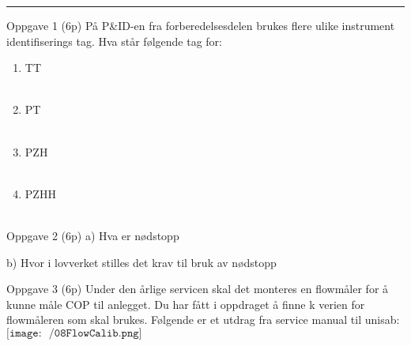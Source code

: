 \hrule
\vfil \eject
Oppgave 1 (6p)%
\vskip 2.5pt 
På P\&ID-en fra forberedelsesdelen brukes flere ulike instrument identifiserings tag. Hva står følgende tag for:\begin{enumerate}
	\item TT \\\\
	\item PT\\\\
	\item PZH\\\\
	\item PZHH\\\\
\end{enumerate}


\vskip 2.5pt 


Oppgave 2 (6p) %
\vskip 2.5pt 
a) Hva er nødstopp \\
\vskip 2.5pt 
\vskip 2.5pt 
b) Hvor i lovverket stilles det krav til bruk av nødstopp \\
\vskip 2.5pt 
\vskip 2.5pt 
\newpage
Oppgave 3 (6p)%
\vskip 2.5pt 
Under den årlige servicen skal det monteres en flowmåler for å kunne måle COP til anlegget. Du har fått i oppdraget å finne k verien for flowmåleren som skal brukes. 
Følgende er et utdrag fra service manual til unisab:
\vskip 15pt 
$\texttt{[image: ~/08FlowCalib.png]}$\\

